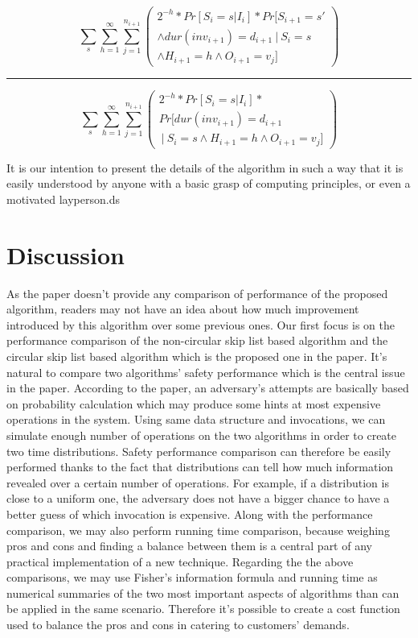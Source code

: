 \documentclass[11pt,twocolumn]{article}
\begin{document}
\begin{minipage}{.5\textwidth}

$$\sum_s\sum_{h=1}^\infty\sum_{j=1}^{n_{i+1}} \left( \begin{matrix}
2^{-h}*Pr[S_i=s | I_i]*Pr[S_{i+1}=s' \\ \land dur(inv_{i+1})=d_{i+1}\  
|\  S_i=s \\ \land H_{i+1}=h \land O_{i+1}=v_j] \end{matrix} \right)$$
\hrule
$$\sum_s\sum_{h=1}^\infty\sum_{j=1}^{n_{i+1}} 
\left( \begin{matrix}2^{-h}*Pr[S_i=s | I_i]*
\\Pr[ dur(inv_{i+1})=d_{i+1} \\ \  | \  S_i=s \land H_{i+1}=h \land O_{i+1}=v_j] \end{matrix} \right)$$

\end{minipage}

It is our intention to present the details of the algorithm in such a way that
it is easily understood by anyone with a basic grasp of computing principles,
or even a motivated layperson.ds


\section{Discussion}

As the paper doesn't provide any comparison of performance of the proposed algorithm, readers may not have an idea about how much improvement introduced by this algorithm over some previous ones. Our first focus is on the performance comparison of the non-circular skip list based algorithm and the circular skip list based algorithm which is the proposed one in the paper. It's natural to compare two algorithms' safety performance which is the central issue in the paper. According to the paper, an adversary's attempts are basically based on probability calculation which may produce some hints at most expensive operations in the system. Using same data structure and invocations, we can simulate enough number of operations on the two algorithms in order to create two time distributions. Safety performance comparison can therefore be easily performed thanks to the fact that distributions can tell how much information revealed over a certain number of operations. For example, if a distribution is close to a uniform one, the adversary does not have a bigger chance to have a  better guess of which invocation is expensive. Along with the performance comparison, we may also perform running time comparison, because weighing pros and cons and finding a balance between them is a central part of any practical implementation of a new technique. Regarding the the above comparisons, we may use Fisher's information formula and running time as numerical summaries of the two most important aspects of algorithms than can be applied in the same scenario. Therefore it's possible to create  a cost function used to balance the pros and cons in catering to customers' demands. 
\end{document}
